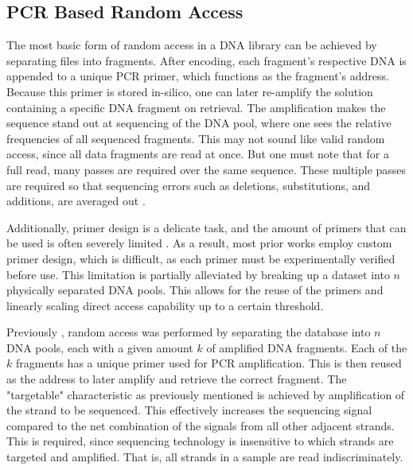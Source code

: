 \documentclass[a4paper,conference]{IEEEtran}
\begin{document}
\subsection{PCR Based Random Access}
The most basic form of random access in a DNA library can be achieved by separating files into fragments. After encoding, each fragment's respective DNA is appended to a unique PCR primer, which functions as the fragment's address. Because this primer is stored in-silico, one can later re-amplify the solution containing a specific DNA fragment on retrieval. The amplification makes the sequence stand out at sequencing of the DNA pool, where one sees the relative frequencies of all sequenced fragments. This may not sound like valid random access, since all data fragments are read at once. But one must note that for a full read, many passes are required over the same sequence. These multiple passes are required so that sequencing errors such as deletions, substitutions, and additions, are averaged out \cite{}.

Additionally, primer design is a delicate task, and the amount of primers that can be used is often severely limited \cite{}. As a result, most prior works employ custom primer design, which is difficult, as each primer must be experimentally verified before use. This limitation is partially alleviated by breaking up a dataset into $n$ physically separated DNA pools. This allows for the reuse of the primers and linearly scaling direct access capability up to a certain threshold.

Previously \cite{pcrbased}, random access was performed by separating the database into $n$ DNA pools, each with a given amount $k$ of amplified DNA fragments. Each of the $k$ fragments has a unique primer used for PCR amplification. This is then reused as the address to later amplify and retrieve the correct fragment. The "targetable" characteristic as previously mentioned is achieved by amplification of the strand to be sequenced. This effectively increases the sequencing signal compared to the net combination of the signals from all other adjacent strands. This is required, since sequencing technology is insensitive to which strands are targeted and amplified. That is, all strands in a sample are read indiscriminately.

\end{document}
